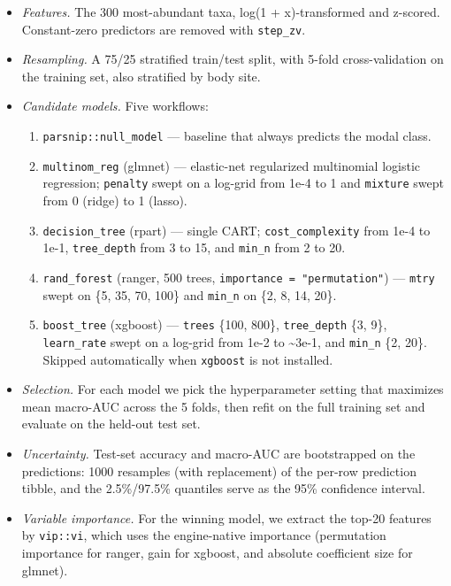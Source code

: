 \documentclass[
  letterpaper,
  DIV=11,
  numbers=noendperiod]{scrartcl}
\providecommand{\tightlist}{%
  \setlength{\itemsep}{0pt}\setlength{\parskip}{0pt}}
\begin{document}
\begin{itemize}
\tightlist
\item
  \emph{Features.} The 300 most-abundant taxa, log(1 + x)-transformed
  and z-scored. Constant-zero predictors are removed with
  \texttt{step\_zv}.
\item
  \emph{Resampling.} A 75/25 stratified train/test split, with 5-fold
  cross-validation on the training set, also stratified by body site.
\item
  \emph{Candidate models.} Five workflows:

  \begin{enumerate}
  \def\labelenumi{\arabic{enumi}.}
  \tightlist
  \item
    \texttt{parsnip::null\_model} --- baseline that always predicts the
    modal class.
  \item
    \texttt{multinom\_reg} (glmnet) --- elastic-net regularized
    multinomial logistic regression; \texttt{penalty} swept on a
    log-grid from 1e-4 to 1 and \texttt{mixture} swept from 0 (ridge) to
    1 (lasso).
  \item
    \texttt{decision\_tree} (rpart) --- single CART;
    \texttt{cost\_complexity} from 1e-4 to 1e-1, \texttt{tree\_depth}
    from 3 to 15, and \texttt{min\_n} from 2 to 20.
  \item
    \texttt{rand\_forest} (ranger, 500 trees,
    \texttt{importance\ =\ "permutation"}) --- \texttt{mtry} swept on
    \{5, 35, 70, 100\} and \texttt{min\_n} on \{2, 8, 14, 20\}.
  \item
    \texttt{boost\_tree} (xgboost) --- \texttt{trees} \{100, 800\},
    \texttt{tree\_depth} \{3, 9\}, \texttt{learn\_rate} swept on a
    log-grid from 1e-2 to \textasciitilde3e-1, and \texttt{min\_n} \{2,
    20\}. Skipped automatically when \texttt{xgboost} is not installed.
  \end{enumerate}
\item
  \emph{Selection.} For each model we pick the hyperparameter setting
  that maximizes mean macro-AUC across the 5 folds, then refit on the
  full training set and evaluate on the held-out test set.
\item
  \emph{Uncertainty.} Test-set accuracy and macro-AUC are bootstrapped
  on the predictions: 1000 resamples (with replacement) of the per-row
  prediction tibble, and the 2.5\%/97.5\% quantiles serve as the 95\%
  confidence interval.
\item
  \emph{Variable importance.} For the winning model, we extract the
  top-20 features by \texttt{vip::vi}, which uses the engine-native
  importance (permutation importance for ranger, gain for xgboost, and
  absolute coefficient size for glmnet).
\end{itemize}
\end{document}
